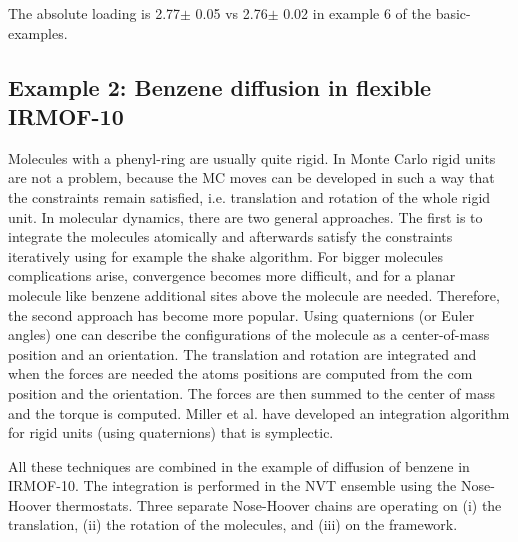 The absolute loading is 2.77$\pm$ 0.05 vs 2.76$\pm$ 0.02 in example 6 of the basic-examples.

\subsection*{Example 2: Benzene diffusion in flexible IRMOF-10}

Molecules with a phenyl-ring are usually quite rigid. In Monte Carlo rigid units are not a problem, because the MC moves can be developed in such a way that the
constraints remain satisfied, i.e. translation and rotation of the whole rigid unit. In molecular dynamics, there are two general approaches. The first is to integrate
the molecules atomically and afterwards satisfy the constraints iteratively using for example the shake algorithm. For bigger molecules complications arise, convergence
becomes more difficult, and for a planar molecule like benzene additional sites above the molecule are needed. Therefore, the second approach has become more popular. 
Using quaternions (or Euler angles) one can describe the configurations of the molecule as a center-of-mass position and an orientation. The translation and rotation
are integrated and when the forces are needed the atoms positions are computed from the com position and the orientation. The forces are then summed to the center of mass
and the torque is computed. Miller et al. have developed an integration algorithm for rigid units (using quaternions) that is symplectic.

All these techniques are combined in the example of diffusion of benzene in IRMOF-10. The integration is performed in the NVT ensemble using the Nose-Hoover thermostats.
Three separate Nose-Hoover chains are operating on (i) the translation, (ii) the rotation of the molecules, and (iii) on the framework.

